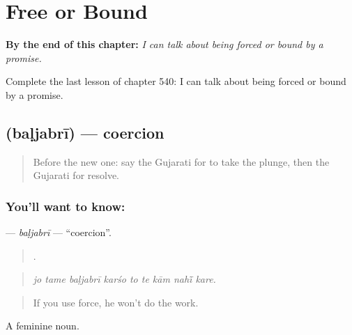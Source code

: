 
\chapter{Free or Bound}
\label{ch:gu-free-or-bound}

\begin{chapteropening}
\textbf{By the end of this chapter:} \emph{I can talk about being forced or bound by a promise.}

Complete the last lesson of chapter 540: I can talk about being forced or bound by a promise.
\end{chapteropening}

\section[\texorpdfstring{\gu{બળજબરી} (baḷjabrī)}{બળજબરી (baḷjabrī)}]{ (baḷjabrī) — coercion}

\label{lesson:GU-C540-baljabri}



\begin{quote}
Before the new one: say the Gujarati for to take the plunge, then the Gujarati for resolve.
\end{quote}

\subsection*{You'll want to know: }
\textbf{} — \emph{baḷjabrī} — \textquotedblleft{}coercion\textquotedblright{}.

\begin{quote}
        .
\end{quote}

\begin{quote}
\emph{jo tame baḷjabrī karśo to te kām nahī̃ kare.}
\end{quote}

\begin{quote}
If you use force, he won't do the work.
\end{quote}

A feminine noun.

